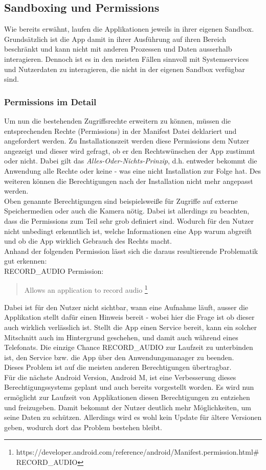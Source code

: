 	\subsection{Sandboxing und Permissions} \label{sec:SandBoxingNPermissions}
	Wie bereits erwähnt, laufen die Applikationen jeweils in ihrer eigenen Sandbox. Grundsätzlich ist die App damit in ihrer Ausführung auf ihren Bereich beschränkt und kann nicht mit anderen Prozessen und Daten ausserhalb interagieren. Dennoch ist es in den meisten Fällen sinnvoll mit Systemservices und Nutzerdaten zu interagieren, die nicht in der eigenen Sandbox verfügbar sind. 
	
	\subsubsection{Permissions im Detail}
	Um nun die bestehenden Zugriffsrechte erweitern zu können, müssen die entsprechenden Rechte (Permissions) in der Manifest Datei deklariert und angefordert werden. Zu Installationszeit werden diese Permissions dem Nutzer angezeigt und dieser wird gefragt, ob er den Rechtswünschen der App zustimmt oder nicht. Dabei gilt das \textit{Alles-Oder-Nichts-Prinzip}, d.h. entweder bekommt die Anwendung alle Rechte oder keine - was eine nicht Installation zur Folge hat. Des weiteren können die Berechtigungen nach der Installation nicht mehr angepasst werden.\\
	Oben genannte Berechtigungen sind beispielsweiße für Zugriffe auf externe Speichermedien oder auch die Kamera nötig. Dabei ist allerdings zu beachten, dass die Permissions zum Teil sehr grob definiert sind. Wodurch für den Nutzer nicht unbedingt erkenntlich ist, welche Informationen eine App warum abgreift und ob die App wirklich Gebrauch des Rechts macht.\\
	Anhand der folgenden Permission lässt sich die daraus resultierende Problematik gut erkennen:\\
	RECORD\_AUDIO Permission:
	\begin{quote}
	Allows an application to record audio \footnote{https://developer.android.com/reference/android/Manifest.permission.html\#RECORD\_AUDIO}
	\end{quote} 
	Dabei ist für den Nutzer nicht sichtbar, wann eine Aufnahme läuft, ausser die Applikation stellt dafür einen Hinweis bereit - wobei hier die Frage ist ob dieser auch wirklich verlässlich ist. Stellt die App einen Service bereit, kann ein solcher Mitschnitt auch im Hintergrund geschehen, und damit auch während eines Telefonats. Die einzige Chance RECORD\_AUDIO zur Laufzeit zu unterbinden ist, den Service bzw. die App über den Anwendungsmanager zu beenden.\\
	Dieses Problem ist auf die meisten anderen Berechtigungen übertragbar.\\
	Für die nächste Android Version, Android M, ist eine Verbesserung dieses Berechtigungssystems geplant und auch bereits vorgestellt worden. Es wird nun ermöglicht zur Laufzeit von Applikationen diesen Berechtigungen zu entziehen und freizugeben. Damit bekommt der Nutzer deutlich mehr Möglichkeiten, um seine Daten zu schützen. Allerdings wird es wohl kein Update für ältere Versionen geben, wodurch dort das Problem bestehen bleibt.
	
